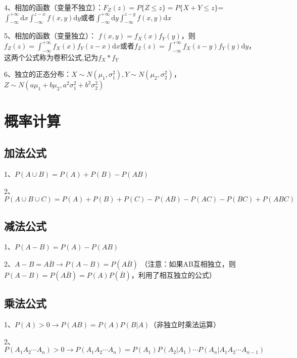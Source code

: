 4、相加的函数（变量不独立）：$F_{Z}(z)=P\{Z \leqslant z\}=P\{X+Y \leqslant z\}$=$\int_{-\infty}^{+\infty} \mathrm{d} x \int_{-\infty}^{z-x} f(x, y) \mathrm{d} y$或者$\int_{-\infty}^{+\infty} \mathrm{d} y \int_{-\infty}^{z-y} f(x, y) \mathrm{d} x$

5、相加的函数（变量独立）： $f(x, y)=f_{X}(x) f_{Y}(y)$，则$f_{Z}(z)=\int_{-\infty}^{+\infty} f_{X}(x) f_{Y}(z-x) \mathrm{d} x$或者$f_{Z}(z)=\int_{-\infty}^{+\infty} f_{X}(z-y) f_{Y}(y) \mathrm{d} y$，这两个公式称为卷积公式,记为$f_{X} * f_{Y}$

6、独立的正态分布：$X \sim{N}\left(\mu_{1}, \sigma_{1}^{2}\right), Y \sim N\left(\mu_{2}, \sigma_{2}^{2}\right)$，$Z \sim N\left(a\mu_{1}+b\mu_{2}, a^2\sigma_{1}^{2}+b^2\sigma_{2}^{2}\right)$

\section{概率计算}



\subsection{加法公式}

1、$P(A\cup B) = P(A)+P(B)-P(AB)$

2、$P(A\cup B \cup C) = P(A)+P(B)+P(C)-P(AB)-P(AC)-P(BC)+P(ABC)$



\subsection{减法公式}

1、$P(A - B) = P(A)-P(AB)$

2、$A-B=A\overline B \rightarrow P(A-B) = P(A\overline B)$ （注意：如果AB互相独立，则$P(A-B) = P(A\overline B)=P(A)P(\overline B)$，利用了相互独立的公式）



\subsection{乘法公式}

1、$P(A)>0 \rightarrow P(AB)=P(A)P(B|A)$（非独立时乘法运算）

2、$P(A_1A_2\cdots A_n) > 0 \rightarrow P(A_1A_2\cdots A_n)=P(A_1)P(A_2|A_1)\cdots P(A_n|A_1A_2\cdots A_{n-1})$

